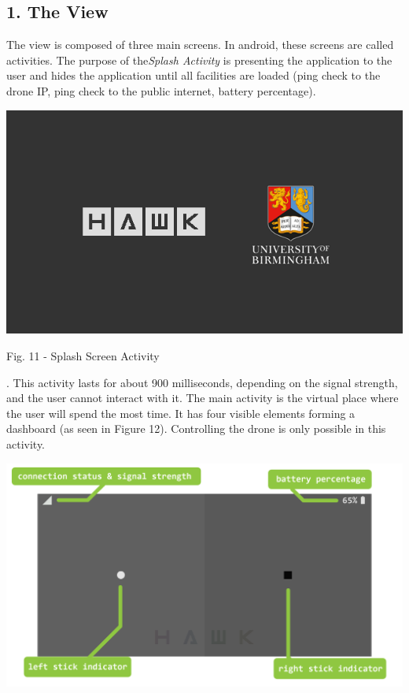 \documentclass{IEEEtran}
\begin{document}
\subsection*{{1. The View}}
\noindent The view is composed of three main screens. In android, these screens are called activities. The purpose of the\textit{Splash Activity} is presenting the application to the user and hides the application until all facilities are loaded (ping check to the drone IP, ping check to the public internet, battery percentage).
\begin{center}\includegraphics[scale=.4]{splashscreen.png}\end{center}
\begin{it}\begin{center}Fig. 11 - Splash Screen Activity \end{center}\end{it}
. This activity lasts for about 900 milliseconds, depending on the signal strength, and the user cannot interact with it.
\newline
\newline
The main activity is the virtual place where the user will spend the most time. It has four visible elements forming a dashboard (as seen in Figure 12). Controlling the drone is only possible in this activity.
\begin{center}\includegraphics[scale=.10]{remote1.png}\end{center}
\end{document}
